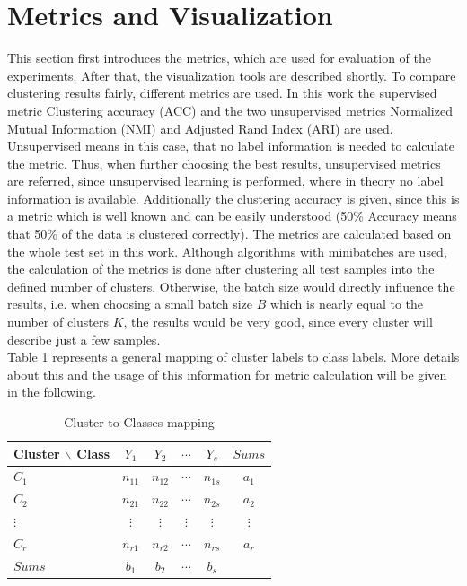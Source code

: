 \documentclass[12pt,DIV14,BCOR12mm,a4paper,footexclude,headinclude,halfparskip-,twoside,openright,cleardoubleempty,idxtotoc,bibtotoc,listtotoc,abstracton]{scrreprt} %
\numberwithin{equation}{chapter}
\begin{document}
\section{Metrics and Visualization}
This section first introduces the metrics, which are used for evaluation of the experiments. After that, the visualization tools are described shortly. To compare clustering results fairly, different metrics are used. In this work the supervised metric Clustering accuracy (ACC) and the two unsupervised metrics Normalized Mutual Information (NMI) and Adjusted Rand Index (ARI) are used. Unsupervised means in this case, that no label information is needed to calculate the metric. Thus, when further choosing the best results, unsupervised metrics are referred, since unsupervised learning is performed, where in theory no label information is available. Additionally the clustering accuracy is given, since this is a metric which is well known and can be easily understood (50\% Accuracy means that 50\% of the data is clustered correctly). The metrics are calculated based on the whole test set in this work. Although algorithms with minibatches are used, the calculation of the metrics is done after clustering all test samples into the defined number of clusters. Otherwise, the batch size would directly influence the results, i.e. when choosing a small batch size $B$ which is nearly equal to the number of clusters $K$, the results would be very good, since every cluster will describe just a few samples.\\
Table \ref{tab:ClusterClassesmapping} represents a general mapping of cluster labels to class labels. More details about this and the usage of this information for metric calculation will be given in the following.
	\begin{table}[htb!]
    		\centering
    		\caption{Cluster to Classes mapping}
    		\label{tab:ClusterClassesmapping}
    		\begin{tabular}{l|cccc|c}
        		Cluster $\backslash$ Class & $Y_1$ & $Y_2$ & $\cdots$ & $Y_s$ & $Sums$\\ \hline
        		$C_1$ & $n_{11}$ & $n_{12}$ & $\cdots$ & $n_{1s}$ & $a_1$\\
        		$C_2$ & $n_{21}$ & $n_{22}$ & $\cdots$ & $n_{2s}$ & $a_2$\\
        		$\vdots$ & $\vdots$ & $\vdots$ & $\vdots$ & $\vdots$ & $\vdots$\\
        		$C_r$ & $n_{r1}$ & $n_{r2}$ & $\cdots$ & $n_{rs}$ & $a_r$\\ \hline
        		$Sums$ & $b_1$ & $b_2$ & $\cdots$ & $b_s$ & \\
    		\end{tabular}
	\end{table}
\end{document}
